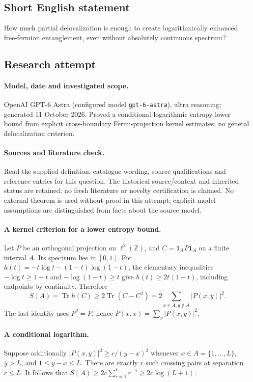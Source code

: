 \documentclass[11pt]{article}
\begin{document}
\subsection{Short English statement}
How much partial delocalization is enough to create logarithmically enhanced free-fermion entanglement, even without absolutely continuous spectrum?
\subsection{Research attempt}
\paragraph{Model, date and investigated scope.}
OpenAI GPT-6 Astra (configured model \texttt{gpt-6-astra}), ultra reasoning; generated 11 October 2026. Proved a conditional logarithmic entropy lower bound from explicit cross-boundary Fermi-projection kernel estimates; no general delocalization criterion.

\paragraph{Sources and literature check.}
Read the supplied definition, catalogue wording, source qualifications and reference entries for this question. The historical source/context and inherited status are retained; no fresh literature or novelty certification is claimed. No external theorem is used without proof in this attempt; explicit model assumptions are distinguished from facts about the source model.

\paragraph{A kernel criterion for a lower entropy bound.} Let \(P\) be an orthogonal projection on \(\ell^2(\mathbb Z)\), and \(C=\mathbf1_A P\mathbf1_A\) on a finite interval \(A\). Its spectrum lies in \([0,1]\). For \(h(t)=-t\log t-(1-t)\log(1-t)\), the elementary inequalities \(-\log t\ge1-t\) and \(-\log(1-t)\ge t\) give \(h(t)\ge2t(1-t)\), including endpoints by continuity. Therefore
\[
 S(A)=\operatorname{Tr}h(C)\ge2\operatorname{Tr}(C-C^2)
 =2\sum_{x\in A,y\notin A}|P(x,y)|^2.
\]
The last identity uses \(P^2=P\), hence \(P(x,x)=\sum_y|P(x,y)|^2\).
\paragraph{A conditional logarithm.} Suppose additionally \(|P(x,y)|^2\ge c/(y-x)^2\) whenever \(x\in A=\{1,\ldots,L\}\), \(y>L\), and \(1\le y-x\le L\). There are exactly \(r\) such crossing pairs at separation \(r\le L\). It follows that \(S(A)\ge2c\sum_{r=1}^Lr^{-1}\ge2c\log(L+1)\).
\end{document}
